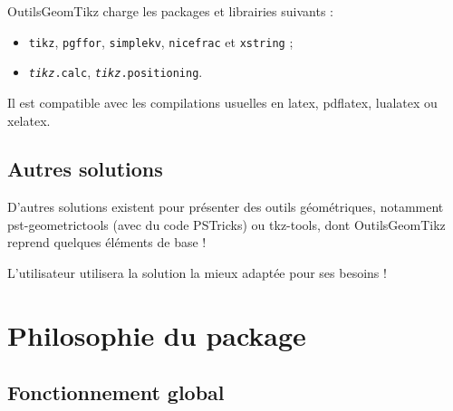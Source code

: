 \documentclass[french,a4paper,11pt]{article}
\providecommand\PSTricks{\textsf{PSTricks}\xspace}
\begin{document}
\begin{noteblock}
\textsf{OutilsGeomTikz} charge les packages et librairies suivants :

\begin{itemize}
	\item \texttt{tikz}, \texttt{pgffor}, \texttt{simplekv}, \texttt{nicefrac} et \texttt{xstring} ;
	\item \texttt{\textit{tikz}.calc}, \texttt{\textit{tikz}.positioning}.
\end{itemize}

Il est compatible avec les compilations usuelles en \textsf{latex}, \textsf{pdflatex}, \textsf{lualatex} ou \textsf{xelatex}.
\end{noteblock}

\subsection{Autres solutions}

\begin{noteblock}
D'autres solutions existent pour présenter des outils géométriques, notamment \textsf{pst-geometrictools}\footnotemark{} (avec du code \PSTricks) ou \textsf{tkz-tools}\footnotemark{}, dont \textsf{OutilsGeomTikz} reprend quelques éléments de base  !

\smallskip

L'utilisateur utilisera la solution la mieux adaptée pour ses besoins !
\end{noteblock}

\pagebreak

\section{Philosophie du package}

\subsection{Fonctionnement global}
\end{document}
